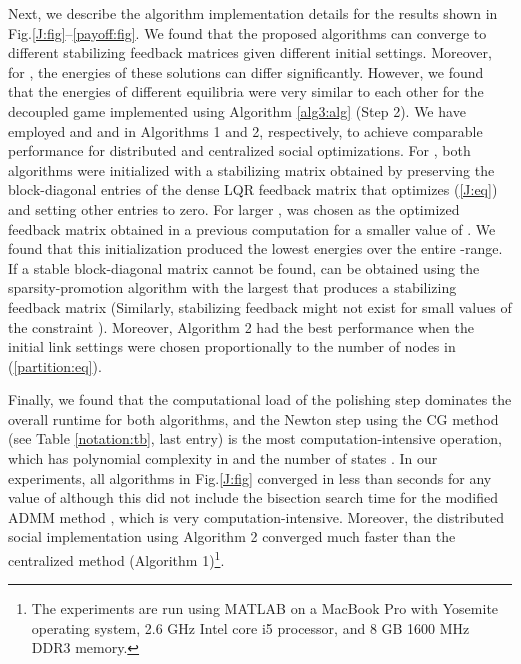 \documentclass[12pt, draftclsnofoot,onecolumn]{IEEEtran}
\begin{document}
Next, we describe the algorithm implementation details for the results shown in Fig.\ref{J:fig}--\ref{payoff:fig}. We found that the proposed algorithms can converge to different stabilizing feedback matrices given different initial settings. Moreover, for , the energies of these solutions can differ significantly. However, we found that the energies of different equilibria were very similar to each other for the decoupled game implemented using Algorithm \ref{alg3:alg} (Step 2). We have employed  and  and  in Algorithms 1 and 2, respectively, to achieve comparable performance for distributed and centralized social optimizations. For , both algorithms were initialized with a stabilizing matrix  obtained by preserving the block-diagonal entries of the dense LQR feedback matrix that optimizes (\ref{J:eq}) and setting other entries to zero. For larger ,  was chosen as the optimized feedback matrix obtained in a previous computation for a smaller value of . We found that this initialization produced the lowest energies over the entire -range. If a stable block-diagonal matrix cannot be found,  can be obtained using the sparsity-promotion algorithm \cite{dorjovchebulTPS14} with the largest  that produces a stabilizing feedback matrix (Similarly, stabilizing feedback might not exist for small values of the constraint ). Moreover, Algorithm 2 had the best performance when the initial link settings  were chosen proportionally to the number of nodes  in (\ref{partition:eq}).  


Finally, we found that the computational load of the polishing step dominates the overall runtime for both algorithms, and the Newton step using the CG method (see Table \ref{notation:tb}, last entry) is the most computation-intensive operation, which has polynomial complexity in  and the number of states \cite{lin2013design}. In our experiments, all algorithms in Fig.\ref{J:fig} converged in less than  seconds for any value of  although this did not include the bisection search time for the modified ADMM method \cite{dorjovchebulTPS14}, which is very computation-intensive. Moreover, the distributed social implementation using Algorithm 2 converged much faster than the centralized method (Algorithm 1)\footnote{The experiments are run using MATLAB on a MacBook Pro with Yosemite operating system, 2.6 GHz Intel core i5 processor, and 8 GB 1600 MHz DDR3 memory.}. 

 
 
\end{document}
